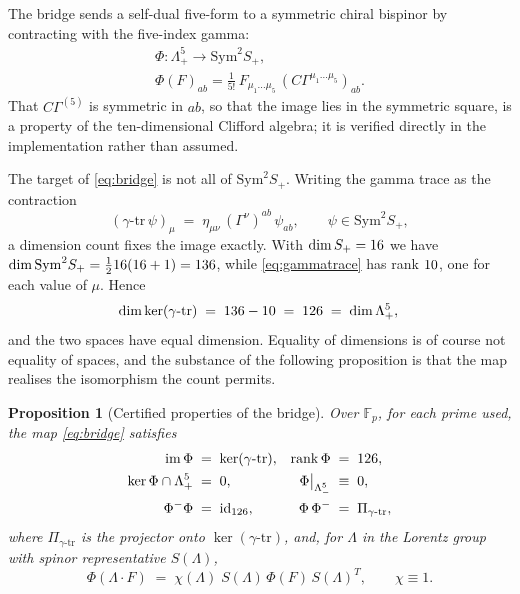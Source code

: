 \documentclass[11pt,a4paper]{article}
\newtheorem{proposition}[theorem]{Proposition}
\theoremstyle{definition}
\theoremstyle{remark}
\newcommand{\Fp}{\mathbb{F}_p}
\begin{document}
The bridge sends a self-dual five-form to a symmetric chiral bispinor by
contracting with the five-index gamma:
\begin{equation}
\begin{gathered}
\Phi: \Lambda^5_+ \longrightarrow \mathrm{Sym}^2 S_+, \\[2pt]
\Phi(F)_{ab} = \frac{1}{5!}\,F_{\mu_1\dots\mu_5}\,
              (C\Gamma^{\mu_1\dots\mu_5})_{ab}.
\end{gathered}
\label{eq:bridge}
\end{equation}
That $C\Gamma^{(5)}$ is symmetric in $ab$, so that the image lies in the
symmetric square, is a property of the ten-dimensional Clifford algebra; it is
verified directly in the implementation rather than assumed.

The target of \eqref{eq:bridge} is not all of $\mathrm{Sym}^2 S_+$. Writing the
gamma trace as the contraction
\begin{equation}
(\gamma\text{-}\mathrm{tr}\,\psi)_\mu
 \;=\; \eta_{\mu\nu}\,(\Gamma^{\nu})^{ab}\,\psi_{ab},
\qquad
\psi \in \mathrm{Sym}^2 S_+,
\label{eq:gammatrace}
\end{equation}
a dimension count fixes the image exactly. With $\dim S_+ = 16$ we have
$\dim \mathrm{Sym}^2 S_+ = \tfrac1216(16+1) = 136$,
while \eqref{eq:gammatrace} has rank $10$, one for each value of
$\mu$. Hence
\begin{equation}
\dim\ker(\gamma\text{-}\mathrm{tr})
 \;=\; 136 - 10
 \;=\; 126
 \;=\; \dim\Lambda^5_+ ,
\vphantom{\bigl|}
\label{eq:dimcount}
\end{equation}
and the two spaces have equal dimension. Equality of dimensions is of course not
equality of spaces, and the substance of the following proposition is that the
map realises the isomorphism the count permits.

\begin{proposition}[Certified properties of the bridge]
\label{prop:bridge}
Over $\Fp$, for each prime used, the map \eqref{eq:bridge} satisfies
\begin{align}
\mathrm{im}\,\Phi &\;=\; \ker(\gamma\text{-}\mathrm{tr}),
  &\mathrm{rank}\,\Phi &\;=\; 126,
  \label{eq:bridgerank}\\
\ker\Phi \cap \Lambda^5_+ &\;=\; 0,
  &\Phi\big|_{\Lambda^5_-} &\;\equiv\; 0,
  \label{eq:bridgekernel}\\
\Phi^-\Phi &\;=\; \mathrm{id}_{126},
  &\Phi\,\Phi^- &\;=\; \Pi_{\gamma\text{-}\mathrm{tr}},
  \label{eq:bridgeinverse}
\end{align}
where $\Pi_{\gamma\text{-}\mathrm{tr}}$ is the projector onto
$\ker(\gamma\text{-}\mathrm{tr})$, and, for $\Lambda$ in the Lorentz group with
spinor representative $S(\Lambda)$,
\begin{equation}
\Phi(\Lambda\cdot F)
 \;=\; \chi(\Lambda)\; S(\Lambda)\,\Phi(F)\,S(\Lambda)^{T},
\qquad
\chi \equiv 1 .
\label{eq:equivariance}
\end{equation}
\end{proposition}
\end{document}
